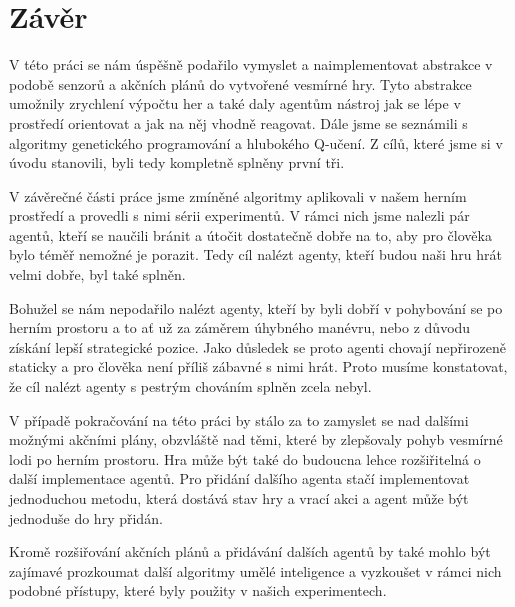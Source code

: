 \chapter*{Závěr}
V této práci se nám úspěšně podařilo vymyslet a naimplementovat abstrakce v podobě senzorů a akčních plánů do vytvořené vesmírné hry.
Tyto abstrakce umožnily zrychlení výpočtu her a také daly agentům nástroj jak se lépe v prostředí orientovat a jak na něj vhodně reagovat.
Dále jsme se seznámili s algoritmy genetického programování a hlubokého Q-učení.
Z cílů, které jsme si v úvodu stanovili, byli tedy kompletně splněny první tři.

V závěrečné části práce jsme zmíněné algoritmy aplikovali v našem herním prostředí a provedli s nimi sérii experimentů.
V rámci nich jsme nalezli pár agentů, kteří se naučili bránit a útočit dostatečně dobře na to, aby pro člověka bylo téměř nemožné je porazit.
Tedy cíl nalézt agenty, kteří budou naši hru hrát velmi dobře, byl také splněn.

Bohužel se nám nepodařilo nalézt agenty, kteří by byli dobří v pohybování se po herním prostoru a to ať už za záměrem úhybného manévru, nebo z důvodu získání lepší strategické pozice.
Jako důsledek se proto agenti chovají nepřirozeně staticky a pro člověka není příliš zábavné s nimi hrát.
Proto musíme konstatovat, že cíl nalézt agenty s pestrým chováním splněn zcela nebyl.

V případě pokračování na této práci by stálo za to zamyslet se nad dalšími možnými akčními plány, obzvláště nad těmi, které by zlepšovaly pohyb vesmírné lodi po herním prostoru.
Hra může být také do budoucna lehce rozšiřitelná o další implementace agentů. Pro přidání dalšího agenta stačí implementovat jednoduchou metodu, která dostává stav hry a vrací akci a agent může být jednoduše do hry přidán. 

Kromě rozšiřování akčních plánů a přidávání dalších agentů by také mohlo být zajímavé prozkoumat další algoritmy umělé inteligence a vyzkoušet v rámci nich podobné přístupy, které byly použity v našich experimentech.


